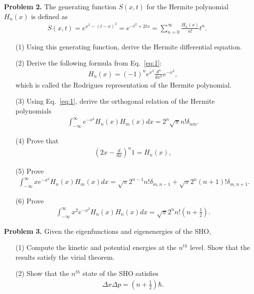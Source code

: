 \documentclass[floatfix,nofootinbib,superscriptaddress,fleqn]{revtex4}
\begin{document}
\noindent \textbf{Problem 2.} 
The generating function $S(x,t)$ for the Hermite polynomial $H_n(x)$
is defined as 
\begin{align}
S(x,t) = e^{x^2-(t-x)^2} = e^{-t^2 + 2 t x} = \sum_{n=0}^\infty
  \frac{H_n(x)}{n!} t^n.  
\label{eq:1}
\end{align}
\begin{itemize}
\item[(1)] Using this generating function, derive the Hermite
  differential equation. 
\item[(2)] Derive the following formula from Eq.~\eqref{eq:1}:
  \begin{align}
H_n(x) = (-1)^n e^{x^2} \frac{d^n}{dx^n} e^{-x^2}    ,
  \end{align}
which is called the Rodrigues representation of the Hermite
polynomial. 
\item[(3)] Using Eq.~\eqref{eq:1}, derive the orthogonal relation of
  the Hermite polynomials
  \begin{align}
    \int_{-\infty}^\infty e^{-x^2} H_n(x) H_m(x) dx = 2^n \sqrt{\pi}
    n! \delta_{nm}.
  \end{align}
\item[(4)] Prove that
  \begin{align}
    \left(2x-\frac{d}{dx}\right)^n 1 = H_n(x),
  \end{align}
\item[(5)] Prove
  \begin{align}
    \int_{-\infty}^\infty x e^{-x^2} H_n(x) H_m(x) dx = \sqrt{\pi}
    2^{n-1} n!\delta_{m,n-1} + \sqrt{\pi} 2^n (n+1)! \delta_{m,n+1}.
  \end{align}
\item[(6)] Prove
  \begin{align}
    \int_{-\infty}^\infty x^2 e^{-x^2} H_n(x) H_n(x) dx = 
\sqrt{\pi} 2^n n! \left(n+\frac12\right).
  \end{align}
\end{itemize}
\vspace{1cm}

\noindent \textbf{Problem 3.} 
Given the eigenfunctions and eigenenergies of the SHO, 
\begin{itemize}
\item[(1)] Compute the kinetic and potential energies at the $n^{th}$
  level.  Show that the results satisfy the virial theorem. 
\item[(2)] Show that the $n^{th}$ state of the SHO satisfies 
  \begin{align}
    \Delta x \Delta p = \left(n+\frac12\right)\hbar.
  \end{align}
\end{itemize}
\end{document}
